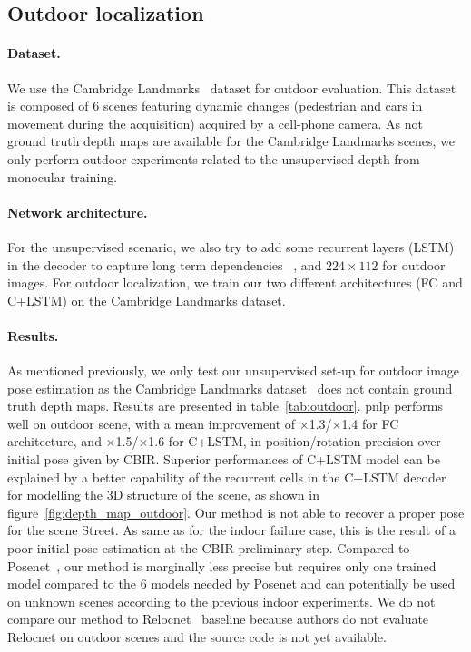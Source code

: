 \subsection{Outdoor localization}
\paragraph{Dataset.} We use the Cambridge Landmarks~\citep{Kendall2015} dataset for outdoor evaluation. This dataset is composed of 6 scenes featuring dynamic changes (pedestrian and cars in movement during the acquisition) acquired by a cell-phone camera. As not ground truth depth maps are available for the Cambridge Landmarks scenes, we only perform outdoor experiments related to the unsupervised depth from monocular training.

\paragraph{Network architecture.} For the unsupervised scenario, we also try to add some recurrent layers (LSTM) in the decoder to capture long term dependencies~\citep{Visin2015, Li2016b}
, and $224 \times 112$ for outdoor images.
For outdoor localization, we train our two different architectures (FC and C+LSTM) on the Cambridge Landmarks dataset.


\paragraph{Results.}


As mentioned previously, we only test our unsupervised set-up for outdoor image pose estimation as the Cambridge Landmarks dataset~\citep{Kendall2015} does not contain ground truth depth maps. Results are presented in table~\ref{tab:outdoor}. \ac{pnlp} performs well on outdoor scene, with a mean improvement of $\times$1.3/$\times$1.4 for FC architecture, and $\times$1.5/$\times$1.6 for C+LSTM, in position/rotation precision over initial pose given by CBIR. Superior performances of C+LSTM model can be explained by a better capability of the recurrent cells in the C+LSTM decoder for modelling the 3D structure of the scene, as shown in figure~\ref{fig:depth_map_outdoor}. Our method is not able to recover a proper pose for the scene Street. As same as for the indoor failure case, this is the result of a poor initial pose estimation at the CBIR preliminary step. Compared to Posenet~\citep{Kendall2017}, our method is marginally less precise but requires only one trained model compared to the 6 models needed by Posenet and can potentially be used on unknown scenes according to the previous indoor experiments. We do not compare our method to Relocnet~\citep{Purkait2018} baseline because authors do not evaluate Relocnet on outdoor scenes and the source code is not yet available.

